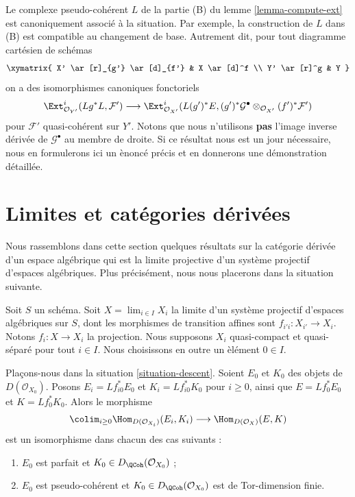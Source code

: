 \begin{remark}
\label{remark-base-change-of-L}
Le complexe pseudo-coh\'erent $L$ de la partie (B) du lemme
\ref{lemma-compute-ext} est canoniquement associ\'e \`a la situation. Par
exemple, la construction de $L$ dans (B) est compatible au changement de
base. Autrement dit, pour tout diagramme cart\'esien de sch\'emas
$$
\xymatrix{
X' \ar[r]_{g'} \ar[d]_{f'} &
X \ar[d]^f \\
Y' \ar[r]^g &
Y
}
$$
on a des isomorphismes canoniques fonctoriels
$$
\Ext^i_{\mathcal{O}_{Y'}}(Lg^*L, \mathcal{F}') \longrightarrow
\Ext^i_{\mathcal{O}_{X'}}(L(g')^*E,
(g')^*\mathcal{G}^\bullet \otimes_{\mathcal{O}_{X'}} (f')^*\mathcal{F}')
$$
pour $\mathcal{F}'$ quasi-coh\'erent sur $Y'$. Notons que nous n'utilisons
{\bf pas} l'image inverse d\'eriv\'ee de $\mathcal{G}^\bullet$ au membre de
droite. Si ce r\'esultat nous est un jour n\'ecessaire, nous en formulerons ici
un \`enonc\'e pr\'ecis et en donnerons une d\'emonstration d\'etaill\'ee.
\end{remark}

\section{Limites et cat\'egories d\'eriv\'ees}
\label{section-limits}

\noindent
Nous rassemblons dans cette section quelques r\'esultats sur la cat\'egorie
d\'eriv\'ee d'un espace alg\'ebrique qui est la limite projective d'un syst\`eme
projectif d'espaces alg\'ebriques. Plus pr\'ecis\'ement, nous nous placerons dans
la situation suivante.

\begin{situation}
\label{situation-descent}
Soit $S$ un sch\'ema. Soit $X=\lim_{i\in I}X_i$ la limite d'un syst\`eme
projectif d'espaces alg\'ebriques sur $S$, dont les morphismes de transition
affines sont $f_{i'i}:X_{i'}\to X_i$. Notons $f_i:X\to X_i$ la projection.
Nous supposons $X_i$ quasi-compact et quasi-s\'epar\'e pour tout $i\in I$.
Nous choisissons en outre un \`el\'ement $0\in I$.
\end{situation}

\begin{lemma}
\label{lemma-descend-homomorphisms}
Pla\c{c}ons-nous dans la situation \ref{situation-descent}. Soient $E_0$ et
$K_0$ des objets de $D(\mathcal{O}_{X_0})$. Posons
$E_i=Lf_{i0}^*E_0$ et $K_i=Lf_{i0}^*K_0$ pour $i\geq0$, ainsi que
$E=Lf_0^*E_0$ et $K=Lf_0^*K_0$. Alors le morphisme
$$
\colim_{i \geq 0} \Hom_{D(\mathcal{O}_{X_i})}(E_i, K_i)
\longrightarrow
\Hom_{D(\mathcal{O}_X)}(E, K)
$$
est un isomorphisme dans chacun des cas suivants :
\begin{enumerate}
\item $E_0$ est parfait et $K_0\in D_\QCoh(\mathcal{O}_{X_0})$ ;
\item $E_0$ est pseudo-coh\'erent et
$K_0\in D_\QCoh(\mathcal{O}_{X_0})$ est de Tor-dimension finie.
\end{enumerate}
\end{lemma}


